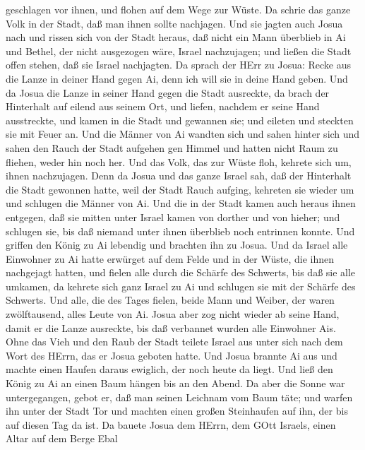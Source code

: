 geschlagen vor ihnen, und flohen auf dem Wege zur Wüste. 
Da schrie das ganze Volk in der Stadt, daß man ihnen sollte nachjagen.
 Und sie jagten auch Josua nach und rissen sich von der
Stadt heraus, daß nicht ein Mann überblieb in Ai und Bethel, der nicht
ausgezogen wäre, Israel nachzujagen; und ließen die Stadt offen stehen,
daß sie Israel nachjagten.  Da sprach der HErr zu Josua:
Recke aus die Lanze in deiner Hand gegen Ai, denn ich will sie in deine
Hand geben. Und da Josua die Lanze in seiner Hand gegen die Stadt
ausreckte,  da brach der Hinterhalt auf eilend aus seinem
Ort, und liefen, nachdem er seine Hand ausstreckte, und kamen in die
Stadt und gewannen sie; und eileten und steckten sie mit Feuer an.
 Und die Männer von Ai wandten sich und sahen hinter sich
und sahen den Rauch der Stadt aufgehen gen Himmel und hatten nicht Raum
zu fliehen, weder hin noch her. Und das Volk, das zur Wüste floh,
kehrete sich um, ihnen nachzujagen.  Denn da Josua und das
ganze Israel sah, daß der Hinterhalt die Stadt gewonnen hatte, weil der
Stadt Rauch aufging, kehreten sie wieder um und schlugen die Männer von
Ai.  Und die in der Stadt kamen auch heraus ihnen entgegen,
daß sie mitten unter Israel kamen von dorther und von hieher; und
schlugen sie, bis daß niemand unter ihnen überblieb noch entrinnen
konnte.  Und griffen den König zu Ai lebendig und brachten
ihn zu Josua.  Und da Israel alle Einwohner zu Ai hatte
erwürget auf dem Felde und in der Wüste, die ihnen nachgejagt hatten,
und fielen alle durch die Schärfe des Schwerts, bis daß sie alle
umkamen, da kehrete sich ganz Israel zu Ai und schlugen sie mit der
Schärfe des Schwerts.  Und alle, die des Tages fielen,
beide Mann und Weiber, der waren zwölftausend, alles Leute von Ai.
 Josua aber zog nicht wieder ab seine Hand, damit er die
Lanze ausreckte, bis daß verbannet wurden alle Einwohner Ais.
 Ohne das Vieh und den Raub der Stadt teilete Israel aus
unter sich nach dem Wort des HErrn, das er Josua geboten hatte.
 Und Josua brannte Ai aus und machte einen Haufen daraus
ewiglich, der noch heute da liegt.  Und ließ den König zu
Ai an einen Baum hängen bis an den Abend. Da aber die Sonne war
untergegangen, gebot er, daß man seinen Leichnam vom Baum täte; und
warfen ihn unter der Stadt Tor und machten einen großen Steinhaufen auf
ihn, der bis auf diesen Tag da ist.  Da bauete Josua dem
HErrn, dem GOtt Israels, einen Altar auf dem Berge Ebal 
